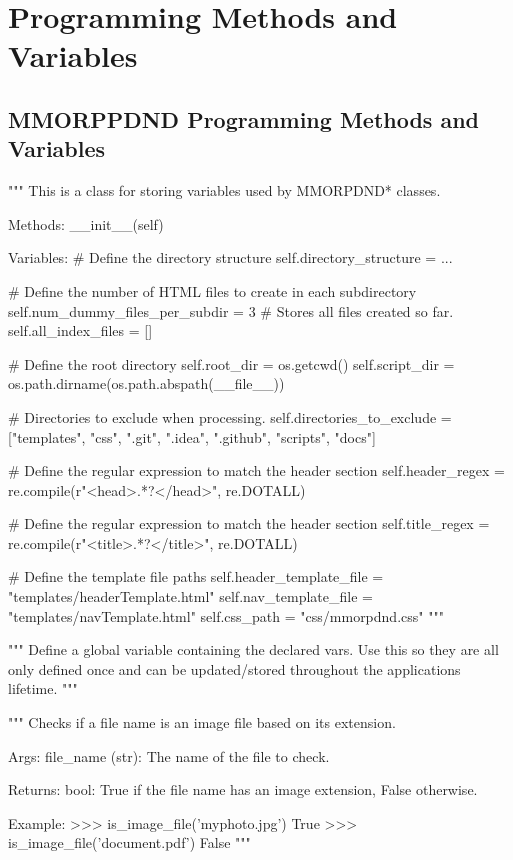 \chapter{Programming Methods and Variables}
\thispagestyle{fancy}  %

\section{MMORPPDND Programming Methods and Variables}

\begin{classbox}
"""
This is a class for storing variables used by MMORPDND* classes.
	
Methods:
	__init__(self)
	
Variables:
	# Define the directory structure
	self.directory_structure = { ... }
	
	# Define the number of HTML files to create in each subdirectory
	self.num_dummy_files_per_subdir = 3  # Stores all files created so far.
	self.all_index_files = []
	
	# Define the root directory
	self.root_dir = os.getcwd()
	self.script_dir = os.path.dirname(os.path.abspath(__file__))
	
	# Directories to exclude when processing.
	self.directories_to_exclude = ["templates", "css", ".git", ".idea", ".github", "scripts", "docs"]
	
	# Define the regular expression to match the header section
	self.header_regex = re.compile(r"<head>.*?</head>", re.DOTALL)
	
	# Define the regular expression to match the header section
	self.title_regex = re.compile(r"<title>.*?</title>", re.DOTALL)
	
	# Define the template file paths
	self.header_template_file = "templates/headerTemplate.html"
	self.nav_template_file = "templates/navTemplate.html"
	self.css_path = "css/mmorpdnd.css"
"""
\end{classbox}

\begin{codebox}[global\_vars = MMORPDND\_VARS()]
"""
Define a global variable containing the declared vars. Use this so they are all only defined once and can be updated/stored throughout the applications lifetime.
"""
\end{codebox}

\begin{codebox}
"""
	Checks if a file name is an image file based on its extension.
	
Args:
	file_name (str): The name of the file to check.
	
Returns:
	bool: True if the file name has an image extension, False otherwise.
	
Example:
	>>> is_image_file('myphoto.jpg')
	True
	>>> is_image_file('document.pdf')
	False
"""
\end{codebox}



